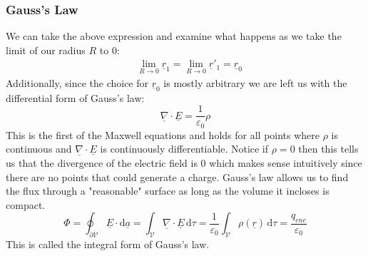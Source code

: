 \documentclass[12pt]{article}
\newcommand{\dive}[1]{\underline{\nabla}\cdot\underline{#1}}
\begin{document}
\subsubsection{Gauss's Law}
We can take the above expression and examine what happens as we take the limit of our radius \(R\) to \(0\):
\begin{align*}
    &\lim_{R\to 0}\underline{r}_1=\lim_{R\to 0}\underline{r}'_1=\underline{r}_0
\end{align*}
Additionally, since the choice for \(\underline{r}_0\) is mostly arbitrary we are left us with the differential form of Gauss's law:
\[\dive{E}=\frac{1}{\varepsilon_0}\rho\]
This is the first of the Maxwell equations and holds for all points where \(\rho\) is continuous and \(\dive{E}\) is continuously differentiable. Notice if \(\rho=0\) then this tells us that the divergence of the electric field is \(0\) which makes sense intuitively since there are no points that could generate a charge. Gauss's law allows us to find the flux through a "reasonable" surface as long as the volume it incloses is compact.
\[\Phi=\oint_{\partial \mathcal{V}}\underline{E}\cdot \text{d}\underline{a}=\int_{\mathcal{V}}\dive{E}\,\text{d}\tau=\frac{1}{\varepsilon_0}\int_{\mathcal{V}}\rho(\underline{r})\,\text{d}\tau=\frac{q_{enc}}{\varepsilon_0}\]
This is called the integral form of Gauss's law.
\end{document}
